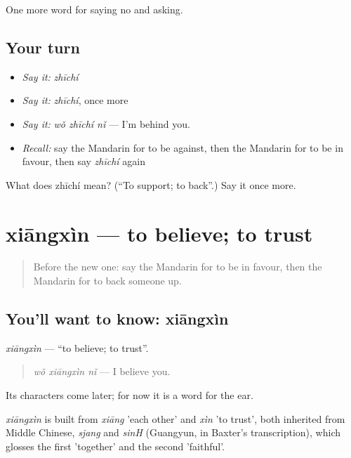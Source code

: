 \begin{grammarlens}[title={What you've built}]
One more word for saying no and asking.
\end{grammarlens}

\subsection*{Your turn}
\begin{itemize}
\raggedright
  \item \emph{Say it:} \emph{zhīchí}
  \item \emph{Say it:} \emph{zhīchí}, once more
  \item \emph{Say it:} \emph{wǒ zhīchí nǐ} — I'm behind you.
  \item \emph{Recall:} say the Mandarin for to be against, then the Mandarin for to be in favour, then say \emph{zhīchí} again
\end{itemize}

\begin{tcolorbox}[breakable,colback=teal!4,colframe=teal!35!black,title={Before you move on}]
What does zhīchí mean? (\textquotedblleft{}To support; to back\textquotedblright{}.) Say it once more.
\end{tcolorbox}
\section[xiāngxìn]{xiāngxìn — to believe; to trust}

\label{lesson:ZH-C270-xiangxin}



\begin{quote}
Before the new one: say the Mandarin for to be in favour, then the Mandarin for to back someone up.
\end{quote}

\subsection*{You'll want to know: xiāngxìn}
\emph{xiāngxìn} — \textquotedblleft{}to believe; to trust\textquotedblright{}.

\begin{quote}
\emph{wǒ xiāngxìn nǐ} — I believe you.
\end{quote}

Its characters come later; for now it is a word for the ear.

\begin{cousinweb}
\emph{xiāngxìn} is built from \emph{xiāng} 'each other' and \emph{xìn} 'to trust', both inherited from Middle Chinese, \emph{sjang} and \emph{sinH} (Guangyun, in Baxter's transcription), which glosses the first 'together' and the second 'faithful'.
\end{cousinweb}

